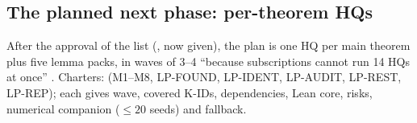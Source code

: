 \subsection{The planned next phase: per-theorem HQs}\label{sec:open:plan}

After the approval of the list (, now given), the plan is one HQ per main theorem plus five lemma packs, in waves of 3--4 ``because subscriptions cannot run 14 HQs at once''  . Charters:  (M1--M8, LP-FOUND, LP-IDENT, LP-AUDIT, LP-REST, LP-REP); each gives wave, covered K-IDs, dependencies, Lean core, risks, numerical companion ($\le20$ seeds) and fallback.

